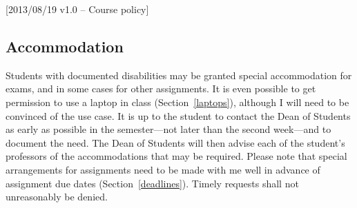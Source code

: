 [2013/08/19 v1.0 -- Course policy]

\subsection{Accommodation}
\label{accommodation}

Students with documented disabilities may be granted special accommodation for
exams, and in some cases for other assignments. It is even possible to get
permission to use a laptop in class (Section~\ref{laptops}), although I will
need to be convinced of the use case. It is up to the student to contact the
Dean of Students as early as possible in the semester---not later than the
second week---and to document the need. The Dean of Students will then advise
each of the student's professors of the accommodations that may be required.
Please note that special arrangements for assignments need to be made with
me well in advance of assignment due dates (Section~\ref{deadlines}). Timely
requests shall not unreasonably be denied.
